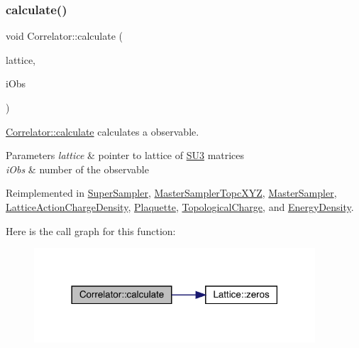 \subsubsection{\texorpdfstring{calculate()}{calculate()}}
{\footnotesize\ttfamily void Correlator\+::calculate (\begin{DoxyParamCaption}\item[{\mbox{\hyperlink{class_lattice}{Lattice}}$<$ \mbox{\hyperlink{class_s_u3}{S\+U3}} $>$ $\ast$}]{lattice,  }\item[{unsigned int}]{i\+Obs }\end{DoxyParamCaption})\hspace{0.3cm}{\ttfamily [virtual]}}



\mbox{\hyperlink{class_correlator_ab33502ff305f891c5c2e6d66a26a0247}{Correlator\+::calculate}} calculates a observable. 


\begin{DoxyParams}{Parameters}
{\em lattice} & pointer to lattice of \mbox{\hyperlink{class_s_u3}{S\+U3}} matrices \\
\hline
{\em i\+Obs} & number of the observable \\
\hline
\end{DoxyParams}


Reimplemented in \mbox{\hyperlink{class_super_sampler_a7e1457583270077c4fbcb288ea9b954c}{Super\+Sampler}}, \mbox{\hyperlink{class_master_sampler_topc_x_y_z_a0ea80ad9935db791f00461b7dfd548b7}{Master\+Sampler\+Topc\+X\+YZ}}, \mbox{\hyperlink{class_master_sampler_ad3cc7e36498dbf4a39238de3ac59ae8b}{Master\+Sampler}}, \mbox{\hyperlink{class_lattice_action_charge_density_a3dddc75188042c645fbdd1c8b3e80c8a}{Lattice\+Action\+Charge\+Density}}, \mbox{\hyperlink{class_plaquette_a40cae6fd587c14836bdf61e69c615a00}{Plaquette}}, \mbox{\hyperlink{class_topological_charge_a8ed78c28c3484df04b1cb24187de2f5b}{Topological\+Charge}}, and \mbox{\hyperlink{class_energy_density_ae8e5e29257104d881bcabeadc3b2c9e7}{Energy\+Density}}.

Here is the call graph for this function\+:
\nopagebreak
\begin{figure}[H]
\begin{center}
\leavevmode
\includegraphics[width=297pt]{class_correlator_ab33502ff305f891c5c2e6d66a26a0247_cgraph}
\end{center}
\end{figure}
\mbox{\label{class_correlator_ac780d8b180294ee4801ede6e6a13f7f4}} 

